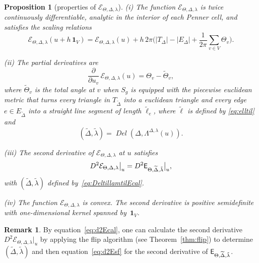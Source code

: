 \documentclass[a4paper, 11pt]{article}
\newcommand{\Deltil}{\widetilde{\Delta}}
\newcommand{\lamtil}{\tilde{\lambda}}
\newcommand{\elltil}{\tilde{\ell}}
\newcommand{\Del}{\operatorname{\textit{Del}}}
\newcommand{\Ecal}{\mathcal{E}}
\newcommand{\Esf}{\scalebox{0.94}{$\mathsf{E}$}}
\theoremstyle{plain}
\newtheorem{proposition}[theorem]{Proposition}
\theoremstyle{definition}
\newtheorem{remark}[theorem]{Remark}
\begin{document}
\begin{proposition}[properties of $\Ecal_{\Theta,\Delta,\lambda}$]
  \label{prop:Ecal}
  (i) The function $\Ecal_{\Theta,\Delta,\lambda}$ is twice
  continuously differentiable, analytic in the interior of each Penner
  cell, and satisfies the scaling relations
  \begin{equation}
    \label{eq:Ecalscale}
    \Ecal_{\Theta,\Delta,\lambda}(u+h\,\mathbf{1}_{V})
    =\Ecal_{\Theta,\Delta,\lambda}(u)
    +h\,2\pi
    \Big(
    |T_{\Delta}|-|E_{\Delta}|+\frac{1}{2\pi}\sum_{v\in V}\Theta_{v}
    \Big).
  \end{equation}

  (ii) The partial derivatives are
  \begin{equation}
    \label{eq:Ecalpartial}
    \frac{\partial}{\partial u_{v}}\,
    \Ecal_{\Theta,\Delta,\lambda}(u)
    =\Theta_{v}-\widetilde{\Theta}_{v},
  \end{equation}
  where $\widetilde{\Theta}_{v}$ is the total angle at $v$ when
  $S_{g}$ is equipped with the piecewise euclidean metric that turns
  every triangle in $T_{\Deltil}$ into a euclidean triangle and every
  edge $e\in E_{\Deltil}$ into a straight line segment of length
  $\tilde{\ell}_{e}$, where $\elltil$ is defined by \eqref{eq:elltil}
  and
  \begin{equation}
    \label{eq:DeltillamtilEcal}
    (\Deltil,\lamtil)=
    \Del(\Delta,\Lambda^{\Delta,\lambda}(u)).
  \end{equation}

  (iii) The second derivative of $\Ecal_{\Theta,\Delta,\lambda}$ at
  $u$ satisfies
    \begin{equation}
    \label{eq:d2Ecal}
    D^{2}\Ecal_{\Theta,\Delta,\lambda}\big|_{u}
    =D^{2}\Esf_{\Theta,\Deltil,\lamtil}\big|_{u},
  \end{equation}
  with $(\Deltil,\lamtil)$ defined by~\eqref{eq:DeltillamtilEcal}.

  (iv) The function $\Ecal_{\Theta,\Delta,\lambda}$ is convex. The
  second derivative is positive semidefinite with one-dimensional
  kernel spanned by~$\mathbf{1}_{V}$.
\end{proposition}

\begin{remark}
  \label{rem:d2Ecal}
  By equation~\eqref{eq:d2Ecal}, one can calculate the second
  derivative $D^{2}\Ecal_{\Theta,\Delta,\lambda}|_{u}$ by applying the
  flip algorithm (see Theorem~\ref{thm:flip}) to determine
  $(\Deltil,\lamtil)$ and then equation~\eqref{eq:d2Esf} for the
  second derivative of $\Esf_{\Theta,\Deltil,\lamtil}$.
\end{remark}
\end{document}
